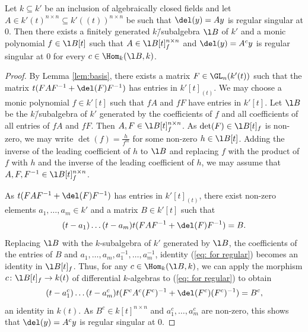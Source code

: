 \documentclass[a4paper, 11pt]{article}
\begin{document}
\begin{lemma}\label{lem: specialize regsing at 0}
	Let $k\subseteq k'$ be an inclusion of algebraically closed fields and let $A \in k'(t)^{n \times n}\subseteq k'((t))^{n\times n}$ be such that $\del(y)=Ay$ is regular singular at $0$. Then there exists a finitely generated $k$\=/subalgebra $\l B$ of $k'$ and a monic polynomial $f \in \l B[t]$ such that $A \in \l B[t]_f^{n \times n}$ and $\del(y)=A^c y$ is regular singular at $0$ for every $c \in \Hom_k(\l B, k)$.	
\end{lemma}
\begin{proof}
By Lemma \ref{lem:basis}, there exists a matrix $F\in\GL_n(k'(t))$ such that the matrix
		$t(FAF^{-1}+\del(F)F^{-1})$ has entries in $k'[t]_{(t)}$. We may choose a monic polynomial $f\in k'[t]$ such that $fA$ and $fF$ have entries in $k'[t]$. Let $\l B$ be the $k$\=/subalgebra of $k'$ generated by the coefficients of $f$ and all coefficients of all entries of $fA$ and $fF$. Then $A,F\in \l B[t]_f^{n\times n}$.
		As $\det(F)\in \l B[t]_f$ is non-zero, we may write $\det(f)=\frac{h}{f^m}$ for some non-zero $h\in \l B[t]$. Adding the inverse of the leading coefficient of $h$ to $\l B$ and replacing $f$ with the product of $f$ with $h$ and the inverse of the leading coefficient of $h$, we may assume that $A, F, F^{-1}\in \l B[t]_f^{n\times n}$. 
		
		As $t(FAF^{-1}+\del(F)F^{-1})$ has entries in $k'[t]_{(t)}$, there exist non-zero elements $a_1,
		\ldots,a_m\in k'$ and a matrix $B\in k'[t]$ such that 
		\begin{equation} \label{eq: for regular}
					(t-a_1)\ldots(t-a_m)t(FAF^{-1}+\del(F)F^{-1})=B.
		\end{equation}		
		Replacing $\l B$ with the $k$-subalgebra of $k'$ generated by $\l B$, the coefficients of the entries of $B$ and $a_1,\ldots,a_m,a_1^{-1},\ldots,a_m^{-1}$, identity (\ref{eq: for regular}) becomes an identity in $\l B[t]_f$. Thus, for any $c \in \Hom_k(\l B, k)$, we can apply the morphism $c\colon \l B[t]_f\to k(t)$ of differential $k$-algebras to (\ref{eq: for regular}) to obtain
		$$
		(t-a_1^c)\ldots(t-a_m^c)t(F^cA^c(F^c)^{-1}+\del(F^c)(F^c)^{-1})=B^c,
		$$
		an identity in $k(t)$. As $B^c\in k[t]^{n\times n}$ and $a_1^c,\ldots,a_m^c$ are non-zero, this shows that $\del(y)=A^cy$ is regular singular at $0$.	
\end{proof}	


\end{document}
